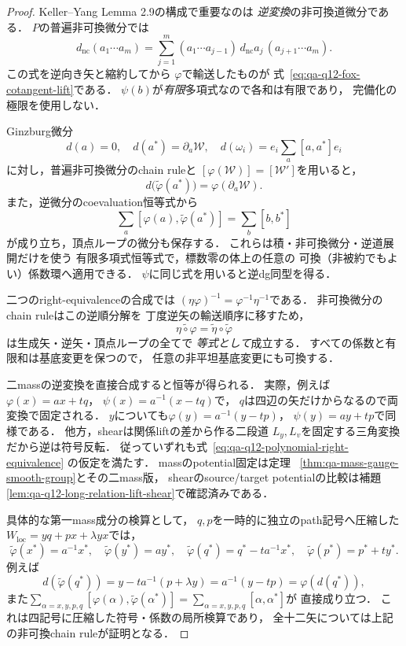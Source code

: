\begin{proof}
Keller--Yang Lemma 2.9の構成で重要なのは
\emph{逆変換}の非可換道微分である．
$P$の普遍非可換微分では
\[
 d_{\mathrm{nc}}(a_1\cdots a_m)
   =\sum_{j=1}^m
     (a_1\cdots a_{j-1})\,d_{\mathrm{nc}}a_j\,
     (a_{j+1}\cdots a_m).
\]
この式を逆向き矢と縮約してから
$\varphi$で輸送したものが
式~\eqref{eq:qa-q12-fox-cotangent-lift}である．
$\psi(b)$が\emph{有限}多項式なので各和は有限であり，
完備化の極限を使用しない．

Ginzburg微分
\[
 d(a)=0,\quad d(a^*)=\partial_a\mathcal W,\quad
 d(\omega_i)=e_i\sum_a[a,a^*]e_i
\]
に対し，普遍非可換微分のchain ruleと
$[\varphi(\mathcal W)]=[\mathcal W']$を用いると，
\[
 d\bigl(\widetilde\varphi(a^*)\bigr)
     =\varphi(\partial_a\mathcal W).
\]
また，逆微分のcoevaluation恒等式から
\[
 \sum_a[\varphi(a),\widetilde\varphi(a^*)]
      =\sum_b[b,b^*]
\]
が成り立ち，頂点ループの微分も保存する．
これらは積・非可換微分・逆道展開だけを使う
有限多項式恒等式で，標数零の体上の任意の
可換（非被約でもよい）係数環へ適用できる．
$\psi$に同じ式を用いると逆dg同型を得る．

二つのright-equivalenceの合成では
$(\eta\varphi)^{-1}=\varphi^{-1}\eta^{-1}$である．
非可換微分のchain ruleはこの逆順分解を
丁度逆矢の輸送順序に移すため，
\[
 \widetilde{\eta\circ\varphi}
       =\widetilde\eta\circ\widetilde\varphi
\]
は生成矢・逆矢・頂点ループの全てで
\emph{等式として}成立する．
すべての係数と有限和は基底変更を保つので，
任意の非平坦基底変更にも可換する．

二massの逆変換を直接合成すると恒等が得られる．
実際，例えば
$\varphi(x)=ax+tq$，
$\psi(x)=a^{-1}(x-tq)$で，
$q$は四辺の矢だけからなるので両変換で固定される．
$y$についても$\varphi(y)=a^{-1}(y-tp)$，
$\psi(y)=ay+tp$で同様である．
他方，shearは関係liftの差から作る二段道
$L_y,L_v$を固定する三角変換だから逆は符号反転．
従っていずれも式~\eqref{eq:qa-q12-polynomial-right-equivalence}
の仮定を満たす．
massのpotential固定は定理~
\ref{thm:qa-mass-gauge-smooth-group}とその二mass版，
shearのsource/target potentialの比較は補題~
\ref{lem:qa-q12-long-relation-lift-shear}で確認済みである．

具体的な第一mass成分の検算として，
$q,p$を一時的に独立のpath記号へ圧縮した
$W_{\mathrm{loc}}=yq+px+\lambda yx$では，
\[
 \widetilde\varphi(x^*)=a^{-1}x^*,\quad
 \widetilde\varphi(y^*)=ay^*,\quad
 \widetilde\varphi(q^*)=q^*-ta^{-1}x^*,\quad
 \widetilde\varphi(p^*)=p^*+t y^* .
\]
例えば
\[
 d(\widetilde\varphi(q^*))
 =y-ta^{-1}(p+\lambda y)
 =a^{-1}(y-tp)
 =\varphi(d(q^*)),
\]
また$\sum_{\alpha=x,y,p,q}[\varphi(\alpha),
\widetilde\varphi(\alpha^*)]
=\sum_{\alpha=x,y,p,q}[\alpha,\alpha^*]$が
直接成り立つ．
これは四記号に圧縮した符号・係数の局所検算であり，
全十二矢については上記の非可換chain ruleが証明となる．
\end{proof}

